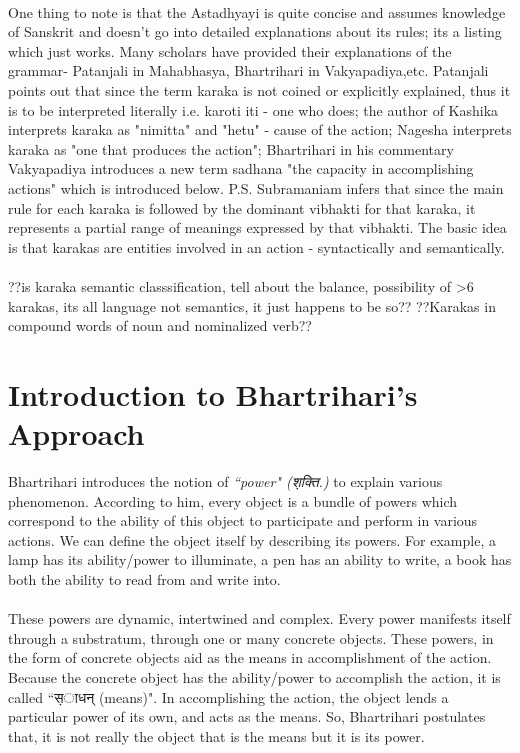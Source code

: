 \documentclass[a4paper,10pt]{article}
\begin{document}
\paragraph{}
\color{black!100}One thing to note is that the Astadhyayi is quite concise and assumes knowledge of Sanskrit and doesn't go into detailed explanations about its rules; its a listing which just works. Many scholars have provided their explanations of the grammar- Patanjali in Mahabhasya, Bhartrihari in Vakyapadiya,etc. Patanjali points out that since the term karaka is not coined or explicitly explained, thus it is to be interpreted literally i.e. karoti iti - one who does; the author of Kashika interprets karaka as "nimitta" and "hetu" - cause of the action; Nagesha interprets karaka as "one that produces the action"; Bhartrihari in his commentary Vakyapadiya introduces a new term sadhana "the capacity in accomplishing actions" which is introduced below. P.S. Subramaniam infers that since the main rule for each karaka is followed by the dominant vibhakti for that karaka, it represents a partial range of meanings expressed by that vibhakti. The basic idea is that karakas are entities involved in an action - syntactically and semantically.

\paragraph{}
??is karaka semantic classsification, tell about the balance, possibility of >6 karakas, its all language not semantics, it just happens to be so??
??Karakas in compound words of noun and nominalized verb??
\newpage
\section{Introduction to Bhartrihari's Approach}

Bhartrihari introduces the notion of \textit{``power" ({\d शक्ति.})} to explain various phenomenon. 
According to him, every object is a bundle of powers which correspond to the ability of this object to participate and perform in various actions. 
We can define the object itself by describing its powers. For example, a lamp has its ability/power to illuminate, a pen has an ability to write,
a book has both the ability to read from and write into.

\paragraph{} These powers are dynamic, intertwined and complex. Every power manifests itself through a substratum, through one or many concrete objects. 
These powers, in the form of concrete objects aid as the means in accomplishment of the action. Because the concrete object has the ability/power 
to accomplish the action, it is called ``{\d साधन्} (means)".
In accomplishing the action, the object lends a particular power of its own, and acts as the means. So, Bhartrihari postulates that, it is not really the object that is the means but it is its power.
\end{document}
